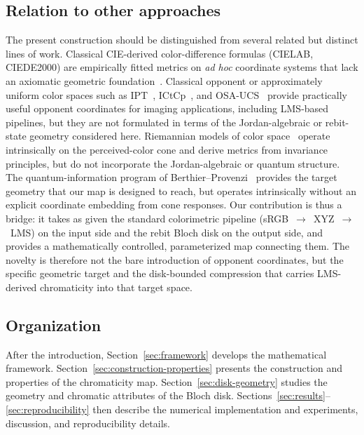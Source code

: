 \documentclass[11pt]{article}
\theoremstyle{plain}
\theoremstyle{definition}
\theoremstyle{remark}
\begin{document}
\subsection{Relation to other approaches}
\label{ssec:related}

The present construction should be distinguished from several related but distinct lines of work.
Classical CIE-derived color-difference formulas (CIELAB, CIEDE2000) are empirically fitted metrics on \emph{ad hoc} coordinate systems that lack an axiomatic geometric foundation~\cite{Wyszecki1982}.
Classical opponent or approximately uniform color spaces such as IPT~\cite{EbnerFairchild1998}, ICtCp~\cite{BT2100}, and OSA-UCS~\cite{Wyszecki1982} provide practically useful opponent coordinates for imaging applications, including LMS-based pipelines, but they are not formulated in terms of the Jordan-algebraic or rebit-state geometry considered here.
Riemannian models of color space~\cite{Resnikoff1974, Provenzi2020} operate intrinsically on the perceived-color cone and derive metrics from invariance principles, but do not incorporate the Jordan-algebraic or quantum structure.
The quantum-information program of Berthier--Provenzi~\cite{Berthier2020, BerthierProvenzi2021hyp, BerthierPrencipeProvenzi2022} provides the target geometry that our map is designed to reach, but operates intrinsically without an explicit coordinate embedding from cone responses.
Our contribution is thus a bridge: it takes as given the standard colorimetric pipeline (sRGB~$\to$~XYZ~$\to$~LMS) on the input side and the rebit Bloch disk on the output side, and provides a mathematically controlled, parameterized map connecting them. The novelty is therefore not the bare introduction of opponent coordinates, but the specific geometric target and the disk-bounded compression that carries LMS-derived chromaticity into that target space.

\subsection{Organization}
\label{ssec:organization}

After the introduction, Section~\ref{sec:framework} develops the mathematical framework. Section~\ref{sec:construction-properties} presents the construction and properties of the chromaticity map. Section~\ref{sec:disk-geometry} studies the geometry and chromatic attributes of the Bloch disk. Sections~\ref{sec:results}--\ref{sec:reproducibility} then describe the numerical implementation and experiments, discussion, and reproducibility details.
\end{document}
